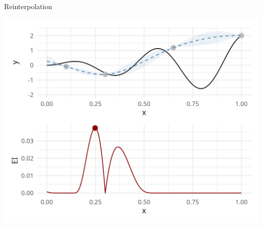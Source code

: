 \documentclass[11pt,compress,t,notes=noshow, xcolor=table]{beamer}
\begin{document}
\begin{frame}{Reinterpolation}
\begin{minipage}[b]{0.45\textwidth}
  \includegraphics[width = \textwidth]{figure_man/noisy_4.png}
\end{minipage}

\end{frame}
\end{document}
